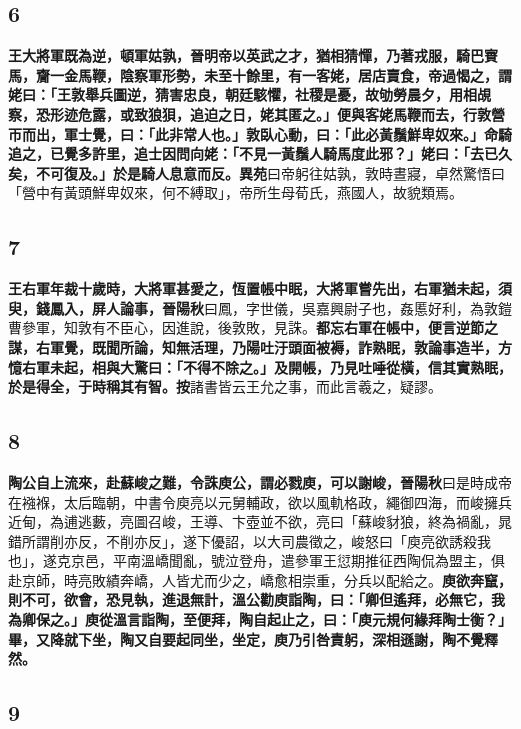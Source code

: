\subsection*{6}

\textbf{王大將軍既為逆，頓軍姑孰，晉明帝以英武之才，猶相猜憚，乃著戎服，騎巴賨馬，齎一金馬鞭，陰察軍形勢，未至十餘里，有一客姥，居店賣食，帝過愒之，謂姥曰：「王敦舉兵圖逆，猜害忠良，朝廷駭懼，社稷是憂，故劬勞晨夕，用相覘察，恐形迹危露，或致狼狽，追迫之日，姥其匿之。」便與客姥馬鞭而去，行敦營帀而出，軍士覺，曰：「此非常人也。」敦臥心動，曰：「此必黃鬚鮮卑奴來。」命騎追之，已覺多許里，追士因問向姥：「不見一黃鬚人騎馬度此邪？」姥曰：「去已久矣，不可復及。」於是騎人息意而反。}{\footnotesize \textbf{異苑}曰帝躬往姑孰，敦時晝寢，卓然驚悟曰「營中有黃頭鮮卑奴來，何不縛取」，帝所生母荀氏，燕國人，故貌類焉。}

\subsection*{7}

\textbf{王右軍年裁十歲時，大將軍甚愛之，恆置帳中眠，大將軍嘗先出，右軍猶未起，須臾，錢鳳入，屏人論事，}{\footnotesize \textbf{晉陽秋}曰鳳，字世儀，吳嘉興尉子也，姦慝好利，為敦鎧曹參軍，知敦有不臣心，因進說，後敦敗，見誅。}\textbf{都忘右軍在帳中，便言逆節之謀，右軍覺，既聞所論，知無活理，乃陽吐汙頭面被褥，詐熟眠，敦論事造半，方憶右軍未起，相與大驚曰：「不得不除之。」及開帳，乃見吐唾從橫，信其實熟眠，於是得全，于時稱其有智。}{\footnotesize \textbf{按}諸書皆云王允之事，而此言羲之，疑謬。}

\subsection*{8}

\textbf{陶公自上流來，赴蘇峻之難，令誅庾公，謂必戮庾，可以謝峻，}{\footnotesize \textbf{晉陽秋}曰是時成帝在襁褓，太后臨朝，中書令庾亮以元舅輔政，欲以風軌格政，繩御四海，而峻擁兵近甸，為逋逃藪，亮圖召峻，王導、卞壺並不欲，亮曰「蘇峻豺狼，終為禍亂，晁錯所謂削亦反，不削亦反」，遂下優詔，以大司農徵之，峻怒曰「庾亮欲誘殺我也」，遂克京邑，平南溫嶠聞亂，號泣登舟，遣參軍王愆期推征西陶侃為盟主，俱赴京師，時亮敗績奔嶠，人皆尤而少之，嶠愈相崇重，分兵以配給之。}\textbf{庾欲奔竄，則不可，欲會，恐見執，進退無計，溫公勸庾詣陶，曰：「卿但遙拜，必無它，我為卿保之。」庾從溫言詣陶，至便拜，陶自起止之，曰：「庾元規何緣拜陶士衡？」畢，又降就下坐，陶又自要起同坐，坐定，庾乃引咎責躬，深相遜謝，陶不覺釋然。}

\subsection*{9}

